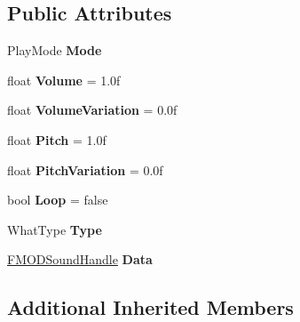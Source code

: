 \subsection*{Public Attributes}
\begin{DoxyCompactItemize}
\item 
\hypertarget{classDCEngine_1_1SoundCue_ad8ce4cc7ce24f24729094346d4424b69}{Play\-Mode {\bfseries Mode}}\label{classDCEngine_1_1SoundCue_ad8ce4cc7ce24f24729094346d4424b69}

\item 
\hypertarget{classDCEngine_1_1SoundCue_a3e01bc3acb9f762c78c766682e4b66bd}{float {\bfseries Volume} = 1.\-0f}\label{classDCEngine_1_1SoundCue_a3e01bc3acb9f762c78c766682e4b66bd}

\item 
\hypertarget{classDCEngine_1_1SoundCue_ae76ed64d1e23857a38ce250bc5755ae5}{float {\bfseries Volume\-Variation} = 0.\-0f}\label{classDCEngine_1_1SoundCue_ae76ed64d1e23857a38ce250bc5755ae5}

\item 
\hypertarget{classDCEngine_1_1SoundCue_ab04511555ec70032b5e1a3ee41ee29a4}{float {\bfseries Pitch} = 1.\-0f}\label{classDCEngine_1_1SoundCue_ab04511555ec70032b5e1a3ee41ee29a4}

\item 
\hypertarget{classDCEngine_1_1SoundCue_a170d52e16f1fab11c24e73b593ea40ba}{float {\bfseries Pitch\-Variation} = 0.\-0f}\label{classDCEngine_1_1SoundCue_a170d52e16f1fab11c24e73b593ea40ba}

\item 
\hypertarget{classDCEngine_1_1SoundCue_ade6163fc6f19ed727a14f20d49b5dcc3}{bool {\bfseries Loop} = false}\label{classDCEngine_1_1SoundCue_ade6163fc6f19ed727a14f20d49b5dcc3}

\item 
\hypertarget{classDCEngine_1_1SoundCue_a8d683df56623b04de60023565c7d3301}{What\-Type {\bfseries Type}}\label{classDCEngine_1_1SoundCue_a8d683df56623b04de60023565c7d3301}

\item 
\hypertarget{classDCEngine_1_1SoundCue_a48d4f9e28d52a4d1aaf5dda5ef22032d}{\hyperlink{classDCEngine_1_1FMODSoundHandle}{F\-M\-O\-D\-Sound\-Handle} {\bfseries Data}}\label{classDCEngine_1_1SoundCue_a48d4f9e28d52a4d1aaf5dda5ef22032d}

\end{DoxyCompactItemize}
\subsection*{Additional Inherited Members}


